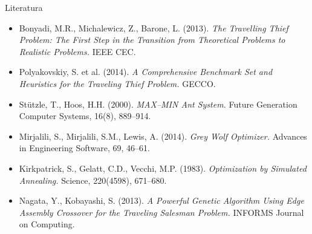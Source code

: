 \documentclass[aspectratio=169]{beamer}
\begin{document}
\begin{frame}{Literatura}
  \footnotesize
  \begin{itemize}
    \item Bonyadi, M.R., Michalewicz, Z., Barone, L. (2013).
      \textit{The Travelling Thief Problem: The First Step in the Transition
      from Theoretical Problems to Realistic Problems.} IEEE CEC.

    \item Polyakovskiy, S. et al. (2014).
      \textit{A Comprehensive Benchmark Set and Heuristics for the
      Traveling Thief Problem.} GECCO.

    \item Stützle, T., Hoos, H.H. (2000).
      \textit{MAX--MIN Ant System.}
      Future Generation Computer Systems, 16(8), 889--914.

    \item Mirjalili, S., Mirjalili, S.M., Lewis, A. (2014).
      \textit{Grey Wolf Optimizer.}
      Advances in Engineering Software, 69, 46--61.

    \item Kirkpatrick, S., Gelatt, C.D., Vecchi, M.P. (1983).
      \textit{Optimization by Simulated Annealing.}
      Science, 220(4598), 671--680.

    \item Nagata, Y., Kobayashi, S. (2013).
      \textit{A Powerful Genetic Algorithm Using Edge Assembly Crossover
      for the Traveling Salesman Problem.} INFORMS Journal on Computing.
  \end{itemize}
\end{frame}
\end{document}
